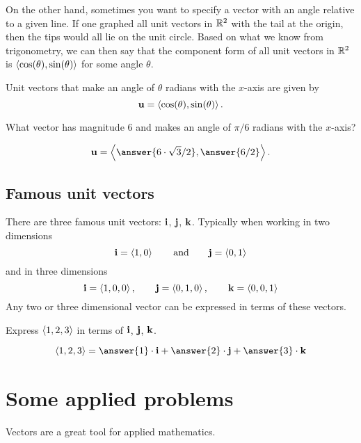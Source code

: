 \documentclass{ximera}
\begin{document}
On the other hand, sometimes you want to specify a vector with an
angle relative to a given line. If one graphed all unit vectors in
$\mathbb R^2$ with the tail at the origin, then the tips would all lie on the
unit circle. Based on what we know from trigonometry, we can then say
that the component form of all unit vectors in $\mathbb R^2$ is
$\left\langle \cos(\theta),\sin(\theta)\right\rangle$ for some angle $\theta$.

\begin{theorem}
  Unit vectors that make an angle of $\theta$ radians with the $x$-axis are given by
  \[
  \mathbf{u} = \left\langle \cos(\theta),\sin(\theta)\right\rangle.
  \]
\end{theorem}


\begin{question}
  What vector has magnitude $6$ and makes an angle of $\pi/6$ radians with the $x$-axis?
  \begin{prompt}
    \[
    \vec{u} = \vector{\answer{6\cdot \sqrt{3}/2},\answer{6/2}}.
    \]
  \end{prompt}
\end{question}

\subsection{Famous unit vectors}

There are three famous unit vectors: $\mathbf{i}$, $\mathbf{j}$,
$\mathbf{k}$. Typically when working in two dimensions
\[
\mathbf{i}=\left\langle 1,0\right\rangle\qquad\text{and}\qquad\mathbf{j}=\left\langle 0,1\right\rangle
\]
and in three dimensions
\[
\mathbf{i}=\left\langle 1,0,0\right\rangle,\qquad \mathbf{j}=\left\langle 0,1,0\right\rangle, \qquad\mathbf{k}=\left\langle 0,0,1\right\rangle
\]
Any two or three dimensional vector can be expressed in terms of these
vectors.

\begin{question}
  Express $\left\langle 1,2,3\right\rangle$ in terms of $\mathbf{i}$, $\mathbf{j}$, $\mathbf{k}$.
  \begin{prompt}
    \[
    \vector{1,2,3} = \answer{1}\cdot \veci + \answer{2}\cdot\vecj + \answer{3}\cdot\veck
    \]
  \end{prompt}
\end{question}



\section{Some applied problems}

Vectors are a great tool for applied mathematics.
\end{document}

